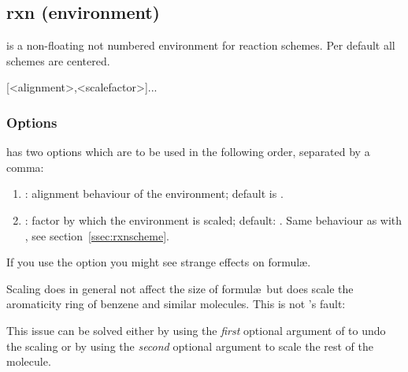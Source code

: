 \documentclass[toc=index,DIV10]{cnpkgdoc}
\begin{document}
\subsection{rxn (environment)}\label{ssec:rxn}
 is a non-floating not numbered environment for reaction schemes. Per
default all schemes are centered.
\begin{beschreibung}
 [<alignment>,<scalefactor>]{...}
\end{beschreibung}

\subsubsection{Options}\label{sssec:rxn_optionen}
 has two options which are to be used in the following order, separated
by a comma:
\begin{enumerate}
 \item{}: alignment behaviour of the  environment;
   default is .
 \item{}: factor by which the  environment is scaled;
   default: . Same behaviour as with , see
   section~\ref{ssec:rxnscheme}.
\end{enumerate}
If you use the  option you might see strange effects on
 formul\ae.

\begin{beispiel}
 \begin{rxn}[,.5]
 \end{rxn}
\end{beispiel}
Scaling does in general not affect the size of  formul\ae\ but
does scale the aromaticity ring of benzene and similar molecules. This is not
\mychemistry's fault:
\begin{beispiel}
\end{beispiel}
This issue can be solved either by using the \emph{first} optional argument of
 to undo the scaling or by using the \emph{second} optional argument
to scale the rest of the molecule.
\begin{beispiel}
 \begin{rxn}[,.5]
 \end{rxn}
\end{beispiel}
\end{document}
